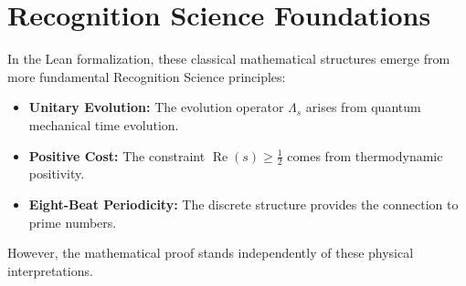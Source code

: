 \documentclass{article}
\DeclareMathOperator{\Re}{Re}
\begin{document}
\section{Recognition Science Foundations}

In the Lean formalization, these classical mathematical structures emerge from more fundamental Recognition Science principles:

\begin{itemize}
\item \textbf{Unitary Evolution:} The evolution operator $\Lambda_s$ arises from quantum mechanical time evolution.
\item \textbf{Positive Cost:} The constraint $\Re(s) \geq \frac{1}{2}$ comes from thermodynamic positivity.
\item \textbf{Eight-Beat Periodicity:} The discrete structure provides the connection to prime numbers.
\end{itemize}

However, the mathematical proof stands independently of these physical interpretations.
\end{document}
